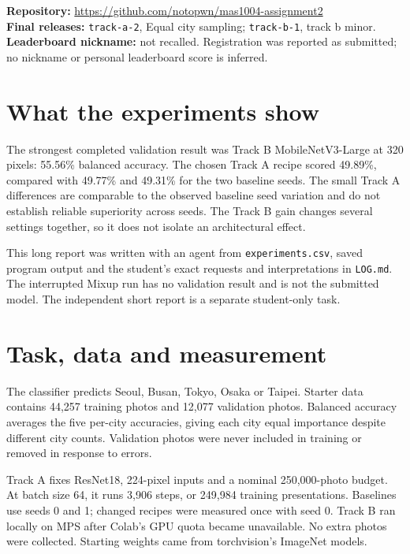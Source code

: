\documentclass[11pt]{article}
\begin{document}
\makeheader
\textbf{Repository:} \url{https://github.com/notopwn/mas1004-assignment2}\\
\textbf{Final releases:} \texttt{track-a-2}, Equal city sampling; \texttt{track-b-1}, track b minor.\\
\textbf{Leaderboard nickname:} not recalled. Registration was reported as submitted; no nickname or personal leaderboard score is inferred.

\section*{What the experiments show}
The strongest completed validation result was Track B MobileNetV3-Large at 320 pixels: 55.56\% balanced accuracy. The chosen Track A recipe scored 49.89\%, compared with 49.77\% and 49.31\% for the two baseline seeds. The small Track A differences are comparable to the observed baseline seed variation and do not establish reliable superiority across seeds. The Track B gain changes several settings together, so it does not isolate an architectural effect.

This long report was written with an agent from \texttt{experiments.csv}, saved program output and the student's exact requests and interpretations in \texttt{LOG.md}. The interrupted Mixup run has no validation result and is not the submitted model. The independent short report is a separate student-only task.

\section*{Task, data and measurement}
The classifier predicts Seoul, Busan, Tokyo, Osaka or Taipei. Starter data contains 44,257 training photos and 12,077 validation photos. Balanced accuracy averages the five per-city accuracies, giving each city equal importance despite different city counts. Validation photos were never included in training or removed in response to errors.

Track A fixes ResNet18, 224-pixel inputs and a nominal 250,000-photo budget. At batch size 64, it runs 3,906 steps, or 249,984 training presentations. Baselines use seeds 0 and 1; changed recipes were measured once with seed 0. Track B ran locally on MPS after Colab's GPU quota became unavailable. No extra photos were collected. Starting weights came from torchvision's ImageNet models.
\end{document}
